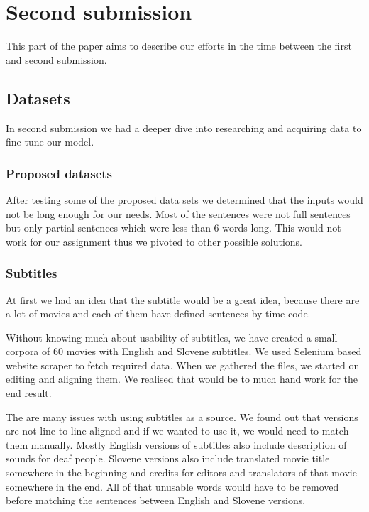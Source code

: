 \documentclass[fleqn,moreauthors,10pt]{ds_report}
\begin{document}
\section*{Second submission}
This part of the paper aims to describe our efforts in the time between the first and second submission.

\subsection{Datasets}
In second submission we had a deeper dive into researching and acquiring data to fine-tune our model.


\subsubsection{Proposed datasets}
After testing some of the proposed data sets we determined that the inputs would not be long enough for our needs. Most of the sentences were not full sentences but only partial sentences which were less than 6 words long. This would not work for our assignment thus we pivoted to other possible solutions.

\subsubsection{Subtitles}
At first we had an idea that the subtitle would be a great idea, because there are a lot of movies and each of them have defined sentences by time-code.

Without knowing much about usability of subtitles, we have created a small corpora of 60 movies with English and Slovene subtitles. We used Selenium based website scraper to fetch required data. When we gathered the files, we started on editing and aligning them. We realised that would be to much hand work for the end result. 

The are many issues with using subtitles as a source. We found out that versions are not line to line aligned and if we wanted to use it, we would need to match them manually. Mostly English versions of subtitles also include description of sounds for deaf people. Slovene versions also include translated movie title somewhere in the beginning and credits for editors and translators of that movie somewhere in the end. All of that unusable words would have to be removed before matching the sentences between English and Slovene versions.
\end{document}
